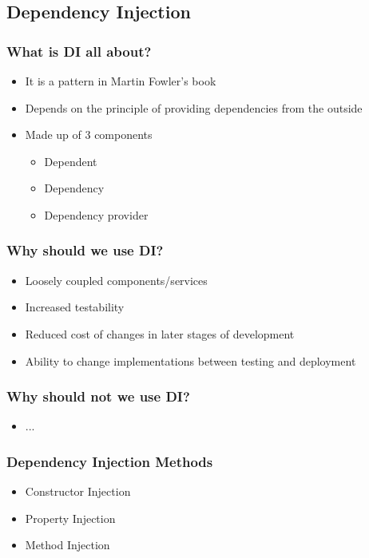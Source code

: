 \documentclass[turkish,handout]{beamer}
\begin{document}
	\subsection{Dependency Injection}
		\frame
		{
		  \frametitle{What is DI all about?}
		
		  \begin{itemize}
		  \item<1-> It is a pattern in Martin Fowler's book
		  \item<2-> Depends on the principle of providing dependencies from the outside
		  \item<3-> Made up of 3 components
			  \begin{itemize}
			  	\item<4->Dependent
			  	\item<5->Dependency
			  	\item<6->Dependency provider
			  \end{itemize}
		  \end{itemize}
		}
		\frame
		{
			\frametitle{Why should we use DI?}
		  \begin{itemize}
		  	\item<1->Loosely coupled components/services
		  	\item<2->Increased testability
		  	\item<3->Reduced cost of changes in later stages of development
		  	\item<4->Ability to change implementations between testing and deployment
		  \end{itemize}
		}
		\frame
		{
			\frametitle{Why should not we use DI?}
		  \begin{itemize}
		  	\item<1-> ...
		  \end{itemize}
		}
		\frame
		{
			\frametitle{Dependency Injection Methods}
		  \begin{itemize}
		  	\item<1->Constructor Injection
		  	\item<2->Property Injection
		  	\item<3->Method Injection
		  \end{itemize}
		}
		\frame
\end{document}
